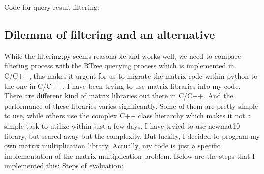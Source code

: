 \documentclass{article}
\begin{document}
Code for query result filtering:

\subsection{Dilemma of filtering and an alternative}
While the filtering.py seems reasonable and works well, we need to
compare filtering process with the RTree querying process which is
implemented in C/C++, this makes it urgent for us to migrate the
matrix code within python to the one in C/C++. I have been trying
to use matrix libraries into my code. 
There are different kind of matrix libraries out there in C/C++. And
the performance of these libraries varies significantly. Some of them
are pretty simple to use, while others use the complex C++ class
hierarchy which makes it not a simple task to utilize within just a
few days. I have tryied to use newmat10 library, but scared away but
the complexity. But luckily, I decided to program my own matrix
multiplication library. Actually, my code is just a specific
implementation of the matrix multiplication problem. 
Below are the steps that I implemented this: 
Steps of evaluation: 

\newpage
\lstlistoflistings
\end{document}
